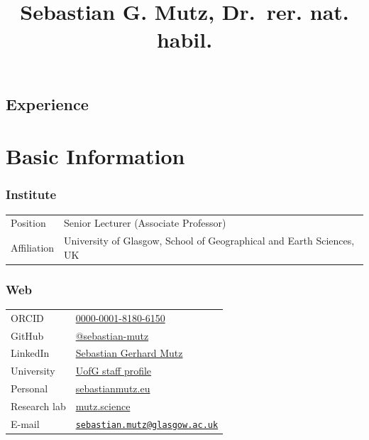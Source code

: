 \documentclass[
  letterpaper,
  DIV=11,
  numbers=noendperiod]{scrartcl}
\title{Sebastian G. Mutz, Dr.~rer. nat. habil.}
\author{}
\date{}
\begin{document}
\maketitle


\color{cvblue}

\subsection{Experience}\label{experience}

\color{black}

\section{\texorpdfstring{{ Basic Information
}}{ Basic Information }}\label{basic-information}

\subsubsection{Institute}\label{institute}

\begin{longtable}[]{@{}
  >{\raggedright\arraybackslash}p{}
  >{\raggedright\arraybackslash}p{}@{}}
\toprule\noalign{}
\endhead
\bottomrule\noalign{}
\endlastfoot
Position & Senior Lecturer (Associate Professor) \\
Affiliation & University of Glasgow, School of Geographical and Earth
Sciences, UK \\
\end{longtable}

\subsubsection{Web}\label{web}

\begin{longtable}[]{@{}
  >{\raggedright\arraybackslash}p{}
  >{\raggedright\arraybackslash}p{}@{}}
\toprule\noalign{}
\endhead
\bottomrule\noalign{}
\endlastfoot
ORCID &
\href{https://orcid.org/0000-0001-8180-6150}{0000-0001-8180-6150} \\
GitHub & \href{https://github.com/sebastian-mutz}{@sebastian-mutz} \\
LinkedIn &
\href{https://www.linkedin.com/in/sebastian-gerhard-m-5b9952210/}{Sebastian
Gerhard Mutz} \\
University &
\href{https://www.gla.ac.uk/schools/ges/staff/sebastianmutz/}{UofG staff
profile} \\
Personal & \href{https://sebastianmutz.eu/}{sebastianmutz.eu} \\
Research lab & \href{https://mutz.science/}{mutz.science} \\
E-mail &
\href{mailto:sebastian.mutz@glasgow.ac.uk}{\nolinkurl{sebastian.mutz@glasgow.ac.uk}} \\
\end{longtable}
\end{document}
